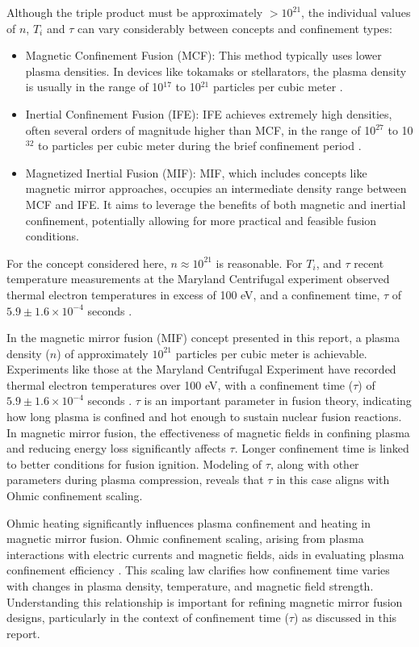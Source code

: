 Although the triple product must be approximately $>10^{21}$, the individual values of $n$, $T_i$ and $\tau$ can vary considerably between concepts and confinement types:

\begin{itemize}
    \item Magnetic Confinement Fusion (MCF): This method typically uses lower plasma densities. In devices like tokamaks or stellarators, the plasma density is usually in the range of 10$^{17}$ to 10$^21$ particles per cubic meter \cite{brezinsek2019mcf}.
\item Inertial Confinement Fusion (IFE): IFE achieves extremely high densities, often several orders of magnitude higher than MCF, in the range of 10$^{27}$ to 10$^32$ to particles per cubic meter during the brief confinement period \cite{brezinsek2019mcf}.
\item Magnetized Inertial Fusion (MIF): MIF, which includes concepts like magnetic mirror approaches, occupies an intermediate density range between MCF and IFE. It aims to leverage the benefits of both magnetic and inertial confinement, potentially allowing for more practical and feasible fusion conditions.
\end{itemize}

For the concept considered here, $n \approx 10^{21}$ is reasonable. For $T_i$, and $\tau$ recent temperature measurements at the Maryland Centrifugal experiment observed thermal electron temperatures in excess of 100 eV, and a confinement time, $\tau$ of $5.9 \pm 1.6 \times 10^{-4}$ seconds \cite{reid2014100}.  

In the magnetic mirror fusion (MIF) concept presented in this report, a plasma density (\(n\)) of approximately \(10^{21}\) particles per cubic meter is achievable. Experiments like those at the Maryland Centrifugal Experiment have recorded thermal electron temperatures over 100 eV, with a confinement time (\(\tau\)) of \(5.9 \pm 1.6 \times 10^{-4}\) seconds \cite{reid2014100}. \(\tau\) is an important parameter in fusion theory, indicating how long plasma is confined and hot enough to sustain nuclear fusion reactions. In magnetic mirror fusion, the effectiveness of magnetic fields in confining plasma and reducing energy loss significantly affects \(\tau\). Longer confinement time is linked to better conditions for fusion ignition. Modeling of \(\tau\), along with other parameters during plasma compression, reveals that \(\tau\) in this case aligns with Ohmic confinement scaling.

Ohmic heating significantly influences plasma confinement and heating in magnetic mirror fusion. Ohmic confinement scaling, arising from plasma interactions with electric currents and magnetic fields, aids in evaluating plasma confinement efficiency \cite{bessenrodt1991multiple}. This scaling law clarifies how confinement time varies with changes in plasma density, temperature, and magnetic field strength. Understanding this relationship is important for refining magnetic mirror fusion designs, particularly in the context of confinement time (\(\tau\)) as discussed in this report.

